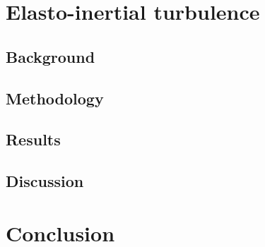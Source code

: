\documentclass[12pt]{report} %
\begin{document}
\chapter{Elasto-inertial turbulence}

\section{Background}

\section{Methodology}

\section{Results}

\section{Discussion}

\chapter{Conclusion}




\end{document}
